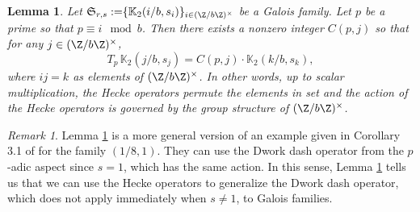 \documentclass[12pt]{amsart}
\newtheorem{Lemma}[theorem]{Lemma}
\theoremstyle{definition}
\theoremstyle{remark}
\newtheorem{remark}{Remark}
\begin{document}
\begin{Lemma}\label{hecke2}
    Let ${\mathfrak {S}_{r,s}:=}\{\mathbb{K}_2(i/b,s_i)\}_{i\in (\Z/b\Z)^\times}$ be a Galois family. Let $p$ be a prime so that $p\equiv i\mod b$. Then there exists a nonzero integer $C(p,j)$ so that for any $j\in (\Z/b\Z)^\times$, \begin{equation*}
    T_p\,\mathbb{K}_2(j/b,s_j)=C(p,j) \cdot \mathbb{K}_2(k/b,s_k),
\end{equation*} where $ij=k$ as elements of $(\Z/b\Z)^\times$. In other words,  up to scalar multiplication, the Hecke operators permute the elements in set and the action of the Hecke operators is governed by the group structure of $(\Z/b\Z)^\times$. 
\end{Lemma}
\begin{remark}
    Lemma \ref{hecke2} is a more general version of an example given in Corollary 3.1 of \cite{aglt} for the family $(1/8,1)$. They can use the Dwork dash operator  from the $p$-adic aspect since $s=1$, which has the same action. In this sense, Lemma \ref{hecke2} tells us that we can use the Hecke operators to generalize the Dwork dash operator, which does not apply immediately when $s\neq 1$, to Galois families.
\end{remark} 
\end{document}
